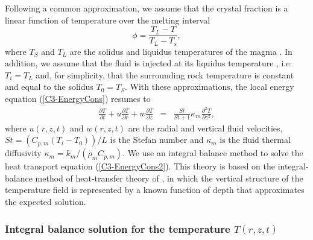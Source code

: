 Following a common approximation, we  assume that the crystal fraction
is a linear function of temperature over the melting interval
\begin{equation}
  \phi = \frac{T_L-T}{T_L-T_s},
  \label{C3-meltfraction}
\end{equation}
where $T_S$ and $T_L$ are the solidus and liquidus temperatures of the
magma \citep{Hort:1997hk,Michaut:2006di}. In  addition, we assume that
the fluid is  injected at its liquidus temperature ,  i.e. $T_i = T_L$
and, for simplicity, that the surrounding rock temperature is constant
and equal  to the solidus  $T_0 =T_S$. With these  approximations, the
local energy equation (\ref{C3-EnergyCons}) resumes to
\begin{eqnarray}
  \frac{\partial T}{\partial t}+ u\frac{\partial T}{\partial r}
  + w\frac{\partial T}{\partial z}  &=& \frac{ St}{St+1}\kappa_m  \frac{\partial^2
                                        T}{\partial               z^2},
                                        \label{C3-EnergyCons2}
\end{eqnarray}
where  $u(r,z,t)$ and  $w(r,z,t)$ are  the radial  and vertical  fluid
velocities, $St =\left(C_{p,m}(T_i-T_0)\right)/L$ is the Stefan number
and     $\kappa_m$     is     the    fluid     thermal     diffusivity
$\kappa_m = k_m/(\rho_m C_{p,m})$.  We  use an integral balance method
to  solve the  heat transport  equation (\ref{C3-EnergyCons2}).   This
theory is based on the integral-balance method of heat-transfer theory
of  \citet{Goodman:1958ue}, in  which  the vertical  structure of  the
temperature field  is represented  by a known  function of  depth that
approximates the expected solution.

\subsubsection*{Integral   balance   solution   for   the   temperature
  $T(r,z,t)$}

